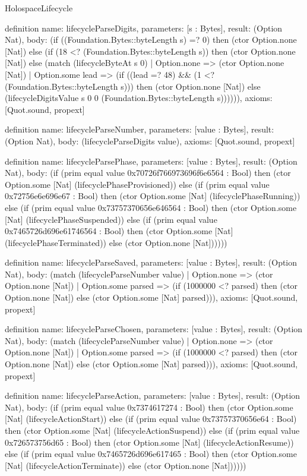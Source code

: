 \begin{lexlean}{HolospaceLifecycle}
\begin{semanticmodule}
definition{
  name: lifecycleParseDigits,
  parameters: [s : Bytes],
  result: (Option Nat),
  body: (if ((Foundation.Bytes::byteLength s) =? 0) then (ctor Option.none [Nat]) else (if (18 <? (Foundation.Bytes::byteLength s)) then (ctor Option.none [Nat]) else (match (lifecycleByteAt s 0)
    | Option.none => (ctor Option.none [Nat])
    | Option.some lead => (if ((lead =? 48) && (1 <? (Foundation.Bytes::byteLength s))) then (ctor Option.none [Nat]) else (lifecycleDigitsValue s 0 0 (Foundation.Bytes::byteLength s)))))),
  axioms: [Quot.sound, propext]
}

definition{
  name: lifecycleParseNumber,
  parameters: [value : Bytes],
  result: (Option Nat),
  body: (lifecycleParseDigits value),
  axioms: [Quot.sound, propext]
}

definition{
  name: lifecycleParsePhase,
  parameters: [value : Bytes],
  result: (Option Nat),
  body: (if (prim equal value 0x70726f766973696f6e6564 : Bool) then (ctor Option.some [Nat] (lifecyclePhaseProvisioned)) else (if (prim equal value 0x72756e6e696e67 : Bool) then (ctor Option.some [Nat] (lifecyclePhaseRunning)) else (if (prim equal value 0x73757370656e646564 : Bool) then (ctor Option.some [Nat] (lifecyclePhaseSuspended)) else (if (prim equal value 0x7465726d696e61746564 : Bool) then (ctor Option.some [Nat] (lifecyclePhaseTerminated)) else (ctor Option.none [Nat])))))
}

definition{
  name: lifecycleParseSaved,
  parameters: [value : Bytes],
  result: (Option Nat),
  body: (match (lifecycleParseNumber value)
    | Option.none => (ctor Option.none [Nat])
    | Option.some parsed => (if (1000000 <? parsed) then (ctor Option.none [Nat]) else (ctor Option.some [Nat] parsed))),
  axioms: [Quot.sound, propext]
}

definition{
  name: lifecycleParseChosen,
  parameters: [value : Bytes],
  result: (Option Nat),
  body: (match (lifecycleParseNumber value)
    | Option.none => (ctor Option.none [Nat])
    | Option.some parsed => (if (1000000 <? parsed) then (ctor Option.none [Nat]) else (ctor Option.some [Nat] parsed))),
  axioms: [Quot.sound, propext]
}

definition{
  name: lifecycleParseAction,
  parameters: [value : Bytes],
  result: (Option Nat),
  body: (if (prim equal value 0x7374617274 : Bool) then (ctor Option.some [Nat] (lifecycleActionStart)) else (if (prim equal value 0x73757370656e64 : Bool) then (ctor Option.some [Nat] (lifecycleActionSuspend)) else (if (prim equal value 0x726573756d65 : Bool) then (ctor Option.some [Nat] (lifecycleActionResume)) else (if (prim equal value 0x7465726d696e617465 : Bool) then (ctor Option.some [Nat] (lifecycleActionTerminate)) else (ctor Option.none [Nat])))))
}


\end{semanticmodule}
\end{lexlean}

